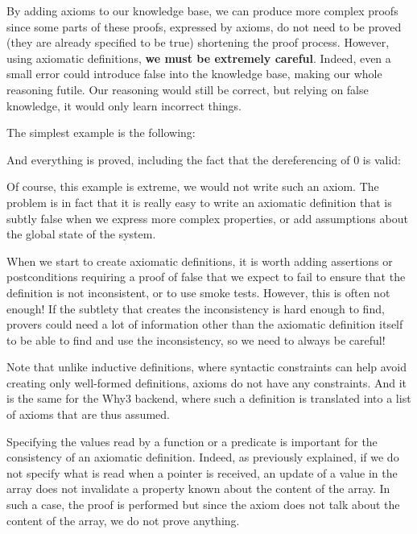

By adding axioms to our knowledge base, we can produce more complex
proofs since some parts of these proofs, expressed by axioms, do not need
to be proved (they are already specified to be true) shortening
the proof process. However, using axiomatic definitions, \textbf{we must
be extremely careful}. Indeed, even a small error could introduce false
into the knowledge base, making our whole reasoning futile. Our reasoning
would still be correct, but relying on false knowledge, it would only
learn incorrect things.


The simplest example is the following:




And everything is proved, including the fact that the dereferencing of
0 is valid:




Of course, this example is extreme, we would not write such an axiom.
The problem is in fact that it is really easy to write an axiomatic
definition that is subtly false when we express more complex properties,
or add assumptions about the global state of the system.


When we start to create axiomatic definitions, it is worth adding assertions or
postconditions requiring a proof of false that we expect to fail to ensure that
the definition is not inconsistent, or to use smoke tests. However, this is
often not enough! If the subtlety that creates the inconsistency is hard enough
to find, provers could need a lot of information other than the axiomatic
definition itself to be able to find and use the inconsistency, so we need to
always be careful!


Note that unlike inductive definitions, where syntactic constraints can help
avoid creating only well-formed definitions, axioms do not have any constraints.
And it is the same for the Why3 backend, where such a definition is translated
into a list of axioms that are thus assumed.




Specifying the values read by a function or a predicate is important for the
consistency of an axiomatic definition. Indeed, as previously explained, if we
do not specify what is read when a pointer is received, an update of a value in
the array does not invalidate a property known about the content of the array.
In such a case, the proof is performed but since the axiom does not talk about
the content of the array, we do not prove anything.


